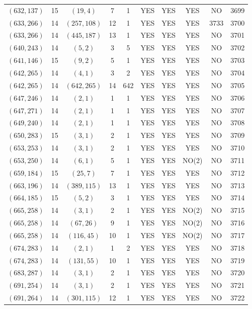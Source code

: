 \begin{longtable}{|c|c|c|c|c|c|c|c|c|c|}
$(632, 137)$ & 15 & $(19, 4)$ & 7 & 1 & YES & YES & YES & NO & 3699\\
$(633, 266)$ & 14 & $(257, 108)$ & 12 & 1 & YES & YES & YES & 3733 & 3700\\
$(633, 266)$ & 14 & $(445, 187)$ & 13 & 1 & YES & YES & YES & NO & 3701\\
$(640, 243)$ & 14 & $(5, 2)$ & 3 & 5 & YES & YES & YES & NO & 3702\\
$(641, 146)$ & 15 & $(9, 2)$ & 5 & 1 & YES & YES & YES & NO & 3703\\
$(642, 265)$ & 14 & $(4, 1)$ & 3 & 2 & YES & YES & YES & NO & 3704\\
$(642, 265)$ & 14 & $(642, 265)$ & 14 & 642 & YES & YES & YES & NO & 3705\\
$(647, 246)$ & 14 & $(2, 1)$ & 1 & 1 & YES & YES & YES & NO & 3706\\
$(647, 271)$ & 14 & $(2, 1)$ & 1 & 1 & YES & YES & YES & NO & 3707\\
$(649, 240)$ & 14 & $(2, 1)$ & 1 & 1 & YES & YES & YES & NO & 3708\\
$(650, 283)$ & 15 & $(3, 1)$ & 2 & 1 & YES & YES & YES & NO & 3709\\
$(653, 253)$ & 14 & $(3, 1)$ & 2 & 1 & YES & YES & YES & NO & 3710\\
$(653, 250)$ & 14 & $(6, 1)$ & 5 & 1 & YES & YES & NO(2) & NO & 3711\\
$(659, 184)$ & 15 & $(25, 7)$ & 7 & 1 & YES & YES & YES & NO & 3712\\
$(663, 196)$ & 14 & $(389, 115)$ & 13 & 1 & YES & YES & YES & NO & 3713\\
$(664, 185)$ & 15 & $(5, 2)$ & 3 & 1 & YES & YES & YES & NO & 3714\\
$(665, 258)$ & 14 & $(3, 1)$ & 2 & 1 & YES & YES & NO(2) & NO & 3715\\
$(665, 258)$ & 14 & $(67, 26)$ & 9 & 1 & YES & YES & NO(2) & NO & 3716\\
$(665, 258)$ & 14 & $(116, 45)$ & 10 & 1 & YES & YES & NO(2) & NO & 3717\\
$(674, 283)$ & 14 & $(2, 1)$ & 1 & 2 & YES & YES & YES & NO & 3718\\
$(674, 283)$ & 14 & $(131, 55)$ & 10 & 1 & YES & YES & YES & NO & 3719\\
$(683, 287)$ & 14 & $(3, 1)$ & 2 & 1 & YES & YES & YES & NO & 3720\\
$(691, 254)$ & 14 & $(3, 1)$ & 2 & 1 & YES & YES & YES & NO & 3721\\
$(691, 264)$ & 14 & $(301, 115)$ & 12 & 1 & YES & YES & YES & NO & 3722\\

\end{longtable}
